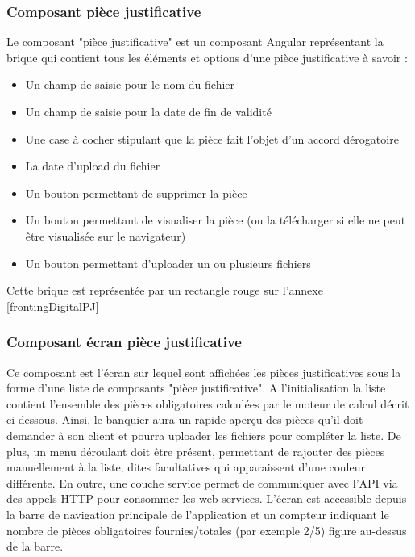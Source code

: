 	\subsubsection{Composant pièce justificative}
	Le composant "pièce justificative" est un composant Angular représentant la brique qui contient tous les éléments et options d'une pièce justificative à savoir :
	\begin{itemize}
		\item Un champ de saisie pour le nom du fichier
		\item Un champ de saisie pour la date de fin de validité
		\item Une case à cocher stipulant que la pièce fait l'objet d'un accord dérogatoire
		\item La date d'upload du fichier
		\item Un bouton permettant de supprimer la pièce
		\item Un bouton permettant de visualiser la pièce (ou la télécharger si elle ne peut être visualisée sur le navigateur)
		\item Un bouton permettant d'uploader un ou plusieurs fichiers
	\end{itemize}
	Cette brique est représentée par un rectangle rouge sur l'annexe \ref{frontingDigitalPJ}
	
	\subsubsection{Composant écran pièce justificative}
	Ce composant est l'écran sur lequel sont affichées les pièces justificatives sous la forme d'une liste de composants "pièce justificative". A l'initialisation la liste contient l'ensemble des pièces obligatoires calculées par le moteur de calcul décrit ci-dessous. Ainsi, le banquier aura un rapide aperçu des pièces qu'il doit demander à son client et pourra uploader les fichiers pour compléter la liste. De plus, un menu déroulant doit être présent, permettant de rajouter des pièces manuellement à la liste, dites facultatives qui apparaissent d'une couleur différente. En outre, une couche service permet de communiquer avec l'API via des appels HTTP pour consommer les web services. L'écran est accessible depuis la barre de navigation principale de l'application et un compteur indiquant le nombre de pièces obligatoires fournies/totales (par exemple 2/5) figure au-dessus de la barre.
	
